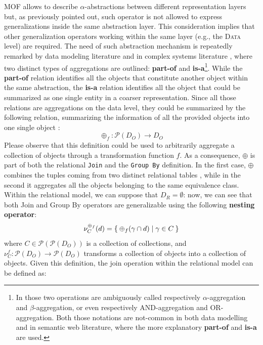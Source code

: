 MOF allows to describe $\alpha$-abstractions between different representation layers but, as previously pointed out, such operator is not allowed to express generalizations inside the same abstraction layer. This consideration implies that other generalization operators working within the same layer (e.g., the \textsc{Data} level) are required. The need of such abstraction mechanism is repeatedly remarked by data modeling literature \cite{Pressman09,Larman04} and in complex systems literature \cite{Johnson2011}, where two distinct types of aggregations are outlined: \textbf{part-of} and \textbf{is-a}\footnote{In \cite{Johnson2011} those two operations are ambiguously called respectively $\alpha$-aggregation and $\beta$-aggregation, or even respectively AND-aggregation and OR-aggregation. Both those notations are not-common in both data modelling and in semantic web literature, where the more explanatory \textbf{part-of} and \textbf{is-a} are used.}. While the \textbf{part-of} relation identifies all the objects that constitute another object within the same abstraction, the \textbf{is-a} relation identifies all the object that could be summarized as one single entity in a coarser representation. Since all those relations are aggregations on the data level, they could be summarized by the following relation, summarizing the information of all the provided objects into one single object \cite{BergamiMM16,BergamiMM17}:
\begin{equation}\label{eq:nestingAggregation}
\oplus_f\colon\mathcal{P}(D_O)\to D_O
\end{equation}
Please observe that this definition could be used to arbitrarily aggregate a collection of objects through a transformation function $f$. As a consequence, $\oplus$ is part of both the relational \texttt{Join} and  the \texttt{Group By} definition. In the first case, $\oplus$  combines the tuples coming from two distinct relational tables \cite{BergamiMM16}, while in the second it aggregates all the objects belonging to the same equivalence class. Within the relational model, we can suppose that $D_R=\emptyset$: now, we can see that both Join and Group By operators are generalizable using the following \textbf{nesting operator}\index{$\nu$}:
\begin{equation}\label{def:nestingfirst}
\nu_C^{\oplus_f}(d)=\Set{\oplus_f(\gamma\cap d)|\gamma\in C}
\end{equation}
where $C\in \mathcal{P}(\mathcal{P}(D_O))$ is a collection of collections, and $\nu_C^f\colon \mathcal{P}(D_O)\to \mathcal{P}(D_O)$ transforms a collection of objects into a collection of objects. Given this definition, the join operation within the relational model can be defined as:

